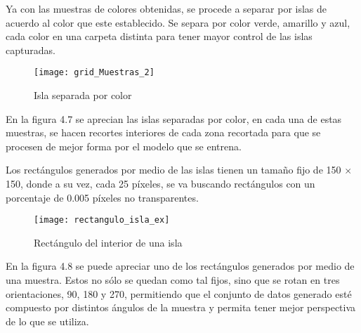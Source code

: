 Ya con las muestras de colores obtenidas, se procede a separar por islas de acuerdo al color que este establecido. Se separa por color verde, amarillo y azul, cada color en una carpeta distinta para tener mayor control de las islas capturadas.

\begin{figure}[H]
  \centering
  \begin{minipage}[b]{0.6\textwidth}
        \texttt{[image: grid\_Muestras\_2]}
    \caption{Isla separada por color}
  \end{minipage}
\end{figure}

En la figura 4.7 se aprecian las islas separadas por color, en cada una de estas muestras, se hacen recortes interiores de cada zona recortada para que se procesen de mejor forma por el modelo que se entrena. 

Los rectángulos generados por medio de las islas tienen un tamaño fijo de 150  $\times$ 150, donde a su vez, cada 25 píxeles, se va buscando rectángulos con un porcentaje de 0.005 píxeles no transparentes.


\begin{figure}[h]
  \centering
  \begin{minipage}[b]{0.7\textwidth}
        \texttt{[image: rectangulo\_isla\_ex]}
    \caption{Rectángulo del interior de una isla}
  \end{minipage}
\end{figure}


En la figura 4.8 se puede apreciar uno de los rectángulos generados por medio de una muestra. Estos no sólo se quedan como tal fijos, sino que se rotan en tres orientaciones, 90, 180 y 270, permitiendo que el conjunto de datos generado esté compuesto por distintos ángulos de la muestra y permita tener mejor perspectiva de lo que se utiliza.

\break

%
%
%
%
%

